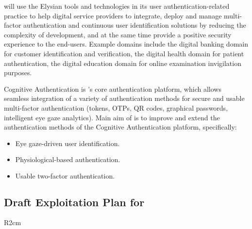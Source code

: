 \documentclass[a4paper,11pt]{article}
\begin{document}
\COGNIshort{} will use the Elysian tools and technologies in its user authentication-related practice to help digital service providers to integrate, deploy and manage multi-factor authentication and continuous user identification solutions by reducing the complexity of development, and at the same time provide a positive security experience to the end-users. Example domains include the digital banking domain for customer identification and verification, the digital health domain for patient authentication, the digital education domain for online examination invigilation purposes. 

Cognitive Authentication is \COGNIshort{}'s core authentication platform, which allows seamless integration of a variety of authentication methods for secure and usable multi-factor authentication (tokens, OTPs, QR codes, graphical passwords, intelligent eye gaze analytics). Main aim of \COGNIshort{} is to improve and extend the authentication methods of the Cognitive Authentication platform, specifically:

\begin{itemize}
    \item Eye gaze-driven user identification. 
    \item Physiological-based authentication.
    \item Usable two-factor authentication.
\end{itemize}

\horizontalline

\subsection*{Draft Exploitation Plan for \SAshort{}}

\begin{wrapfigure}{R}{2cm}
\vspace{-1.4cm}
\hfill {}
\vspace{-0.9cm}
\end{wrapfigure}
\end{document}
